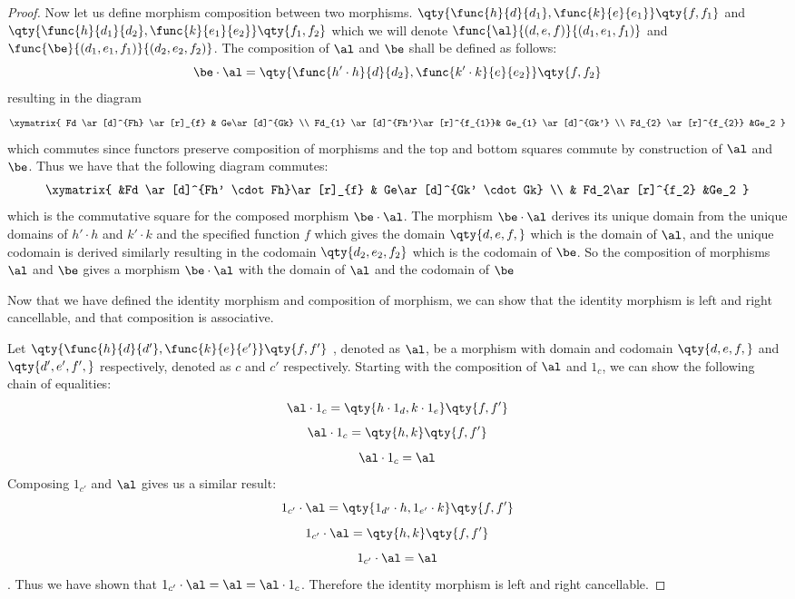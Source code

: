 \documentclass[main.tex]{subfiles}
\begin{document}
\begin{proof}
	Now let us define morphism composition between two morphisms.
	$\qty{\func{h}{d}{d_1},\func{k}{e}{e_1}} \qty{f,f_1}$ and
	$\qty{\func{h}{d_1}{d_2},\func{k}{e_1}{e_2}} \qty{f_1,f_2}$ which we will
	denote $\func{\al}{(d,e,f)}{(d_1,e_1,f_1)}$ and
	$\func{\be}{(d_1,e_1,f_1)}{(d_2,e_2,f_2)}$.
	The composition of $\al$ and $\be$ shall be defined as follows:
	\[\be \cdot \al=\qty{\func{h' \cdot h}{d}{d_{2}},\func{k' \cdot k}{e}{e_{2}}}\qty{f,f_2}\]
	resulting in the diagram
	\[\xymatrix{ Fd \ar[d]^{Fh} \ar[r]_{f} & Ge\ar[d]^{Gk}  \\
			Fd_{1} \ar[d]^{Fh'}\ar[r]^{f_{1}}& Ge_{1} \ar[d]^{Gk'} \\
	Fd_{2} \ar[r]^{f_{2}} &Ge_2 } \]
	which commutes since functors preserve composition of morphisms and the top
	and bottom squares commute by construction of $\al$ and $\be$. Thus we have
	that the following diagram commutes:
	\[\xymatrix{ &Fd \ar[d]^{Fh' \cdot Fh}\ar[r]_{f} & Ge\ar[d]^{Gk' \cdot Gk}
			 \\  & Fd_2\ar[r]^{f_2} &Ge_2 }\]
	which is the commutative square for the composed morphism $\be \cdot \al$.
	The morphism $\be \cdot \al$ derives its unique domain from the unique
	domains of $h' \cdot h$ and $k' \cdot k$ and the specified function $f$
	which gives the domain $\qty{d,e,f,}$ which is the domain of $\al$, and the
	unique codomain is derived similarly resulting in the codomain
	$\qty{d_2,e_2,f_2}$ which is the codomain of $\be$. So the composition of
	morphisms $\al$ and $\be$ gives a morphism $\be \cdot \al$ with the domain
	of $\al$ and the codomain of $\be$

	Now that we have defined the identity morphism and composition of morphism,
	we can show that the identity morphism is left and right cancellable, and
	that composition is associative.

	Let $\qty{\func{h}{d}{d'},\func{k}{e}{e'}} \qty{f,f'}$ , denoted as $\al$,
	be a morphism with domain and codomain $\qty{d,e,f,}$ and $\qty{d',e',f',}$
	respectively, denoted as $c$ and $c'$ respectively. Starting with the
	composition of $\al$ and $1_{c}$, we can show the following chain of
	equalities:
	\[\al \cdot 1_{c } = \qty{h \cdot 1_{d},k \cdot 1_{e}}\qty{f,f'}\]
	\[ \al \cdot 1_{c} = \qty{h,k}\qty{f,f'} \]
	\[ \al \cdot 1_{c} = \al\]
	Composing  $1_{c'}$ and $\al$ gives us a similar result:
	\[ 1_{c' } \cdot \al = \qty{1_{d'} \cdot h, 1_{e'} \cdot k}\qty{f,f'}\]
	\[ 1_{c' } \cdot \al = \qty{h,k}\qty{f,f'}\]
	\[ 1_{c' } \cdot \al = \al\]. Thus we have shown
	that $1_{c' } \cdot \al = \al = \al \cdot 1_{c}$. Therefore the identity
	morphism is left and right cancellable.


\end{proof}
\end{document}
